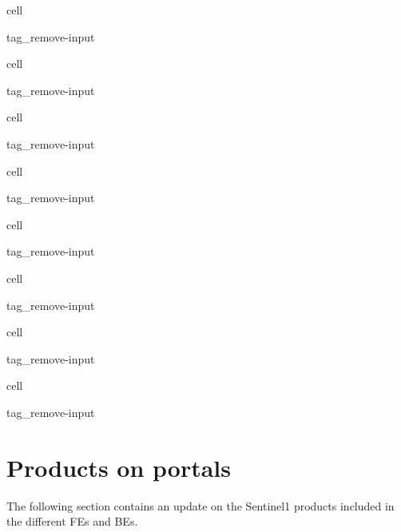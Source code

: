 \documentclass[letterpaper,10pt,english]{jupyterBook}
\begin{document}
\begin{sphinxuseclass}{cell}
\begin{sphinxuseclass}{tag_remove-input}
\end{sphinxuseclass}
\end{sphinxuseclass}
\begin{sphinxuseclass}{cell}
\begin{sphinxuseclass}{tag_remove-input}
\end{sphinxuseclass}
\end{sphinxuseclass}
\begin{sphinxuseclass}{cell}
\begin{sphinxuseclass}{tag_remove-input}
\end{sphinxuseclass}
\end{sphinxuseclass}
\begin{sphinxuseclass}{cell}
\begin{sphinxuseclass}{tag_remove-input}
\end{sphinxuseclass}
\end{sphinxuseclass}
\begin{sphinxuseclass}{cell}
\begin{sphinxuseclass}{tag_remove-input}
\end{sphinxuseclass}
\end{sphinxuseclass}
\begin{sphinxuseclass}{cell}
\begin{sphinxuseclass}{tag_remove-input}
\end{sphinxuseclass}
\end{sphinxuseclass}
\begin{sphinxuseclass}{cell}
\begin{sphinxuseclass}{tag_remove-input}
\end{sphinxuseclass}
\end{sphinxuseclass}
\begin{sphinxuseclass}{cell}
\begin{sphinxuseclass}{tag_remove-input}
\end{sphinxuseclass}
\end{sphinxuseclass}

\section{Products on portals}
\label{\detokenize{S1_portals:products-on-portals}}
\sphinxAtStartPar
The following section contains an update on the Sentinel\sphinxhyphen{}1 products included in the different FEs and BEs.
\end{document}

